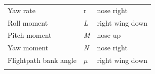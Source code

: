 \documentclass[
]{book}
\begin{document}
\begin{longtable}[]{@{}lll@{}}
\begin{minipage}[t]{0.56\columnwidth}\raggedright
Yaw rate\strut
\end{minipage} & \begin{minipage}[t]{0.12\columnwidth}\raggedright
r\strut
\end{minipage} & \begin{minipage}[t]{0.23\columnwidth}\raggedright
nose right\strut
\end{minipage}\tabularnewline
\begin{minipage}[t]{0.56\columnwidth}\raggedright
Roll moment\strut
\end{minipage} & \begin{minipage}[t]{0.12\columnwidth}\raggedright
\emph{L}\strut
\end{minipage} & \begin{minipage}[t]{0.23\columnwidth}\raggedright
right wing down\strut
\end{minipage}\tabularnewline
\begin{minipage}[t]{0.56\columnwidth}\raggedright
Pitch moment\strut
\end{minipage} & \begin{minipage}[t]{0.12\columnwidth}\raggedright
\emph{M}\strut
\end{minipage} & \begin{minipage}[t]{0.23\columnwidth}\raggedright
nose up\strut
\end{minipage}\tabularnewline
\begin{minipage}[t]{0.56\columnwidth}\raggedright
Yaw moment\strut
\end{minipage} & \begin{minipage}[t]{0.12\columnwidth}\raggedright
\emph{N}\strut
\end{minipage} & \begin{minipage}[t]{0.23\columnwidth}\raggedright
nose right\strut
\end{minipage}\tabularnewline
\begin{minipage}[t]{0.56\columnwidth}\raggedright
Flightpath bank angle\strut
\end{minipage} & \begin{minipage}[t]{0.12\columnwidth}\raggedright
\emph{\(\mu\)}\strut
\end{minipage} & \begin{minipage}[t]{0.23\columnwidth}\raggedright
\textbar{} right wing down\strut
\end{minipage}\tabularnewline
\begin{minipage}[t]{0.56\columnwidth}\raggedright

\end{minipage}
\end{longtable}
\end{document}
